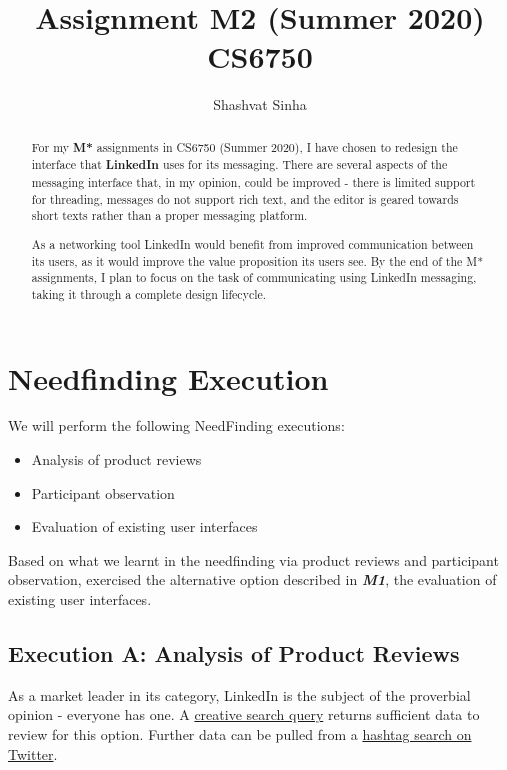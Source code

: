 \documentclass[
	letterpaper, %
]{jdf}
\author{Shashvat Sinha}
\title{Assignment M2 (Summer 2020)\\CS6750}
\begin{document}

\maketitle

\begin{abstract}
    For my \textbf{M*} assignments in CS6750 (Summer 2020), I have chosen to redesign the interface that \textbf{LinkedIn} uses for its messaging. There are several aspects of the messaging interface that, in my opinion, could be improved - there is limited support for threading, messages do not support rich text, and the editor is geared towards short texts rather than a proper messaging platform. 
    
    As a networking tool LinkedIn would benefit from improved communication between its users, as it would improve the value proposition its users see. By the end of the M* assignments, I plan to focus on the task of communicating using LinkedIn messaging, taking it  through a complete design lifecycle. 
\end{abstract}

\section{Needfinding Execution}
We will perform the following NeedFinding executions:

\begin{itemize}
    \item Analysis of product reviews
    \item Participant observation
    \item Evaluation of existing user interfaces
\end{itemize}

Based on what we learnt in the needfinding via product reviews and participant observation,  exercised the alternative option described in \textbf{\emph{M1}}, the evaluation of existing user interfaces.


\subsection{Execution A: Analysis of Product Reviews}
As a market leader in its category, LinkedIn is the subject of  the proverbial opinion - everyone has one. A \href{https://lmgtfy.com/?q=linkedin+sucks}{creative search query} returns sufficient data to review for this option. Further data can be pulled from a \href{https://twitter.com/search?q=linkedinsucks&src=typed_query}{hashtag search on Twitter}.
\end{document}
